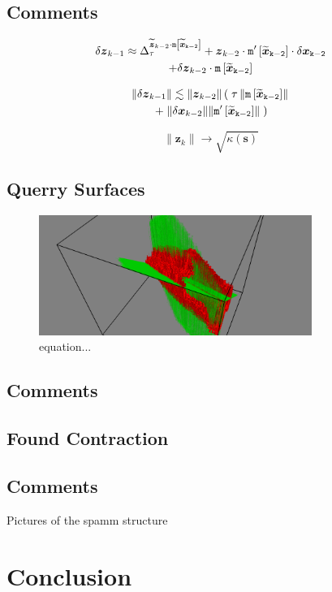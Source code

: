\documentclass[letterpaper,twocolumn,amsmath,amsfont,amssymb,english,aps,jcp,preprintnumbers,groupaddress,nofootinbib,tightenlines]{revtex4}
\newcommand{\mat}[1]{\boldsymbol{#1}}
\begin{document}
\subsection{Comments}

\begin{multline}
 \delta {\mat{z}}_{k-1} \approx \Delta^{\widetilde{\mat{z}}_{k-2} \cdot \tt{m}\left[ \widetilde{\mat{x}}_{k-2}\right]}_\tau 
+ \mat{z}_{k-2} \cdot \tt{m}'\left[ \widetilde{\mat{x}}_{k-2}\right] \cdot \delta \mat{x}_{k-2} \\
+\delta \mat{z}_{k-2} \cdot \tt{m} \left[\widetilde{\mat{x}}_{k-2} \right] 
\end{multline}

\begin{multline}
\lVert \delta {\mat{z}}_{k-1} \rVert \lesssim
\lVert \mat{z}_{k-2} \rVert \left( \;  \tau \, \lVert \tt{m} \left[\widetilde{\mat{x}}_{k-2} \right]  \rVert \right.   \\ \left.
+ \; \lVert \delta {\mat{x}}_{k-2} \rVert   \lVert \tt{m}' \left[\widetilde{\mat{x}}_{k-2} \right] \rVert \; \right)
\end{multline}

\begin{equation}
\lVert \mat{z}_{k} \rVert  \rightarrow \sqrt{\kappa\left(\mat{s} \right)}
\end{equation}

\subsection{Querry Surfaces}

\begin{figure}[h]
  \caption{equation...}
 \includegraphics[width=3.5in]{snapshot.png}
\end{figure}

\subsection{Comments}

\subsection{Found Contraction}

\subsection{Comments}
Pictures of the spamm structure

\section{Conclusion}



\end{document}
